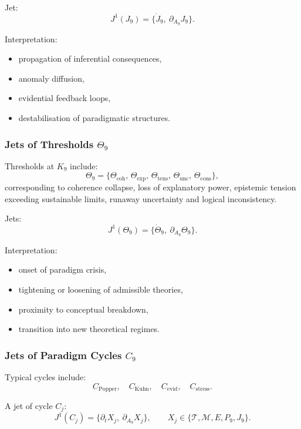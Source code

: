 Jet:
\[
J^1(J_9)=\{\dot{J}_9,\ \partial_{A_9}J_9\}.
\]

Interpretation:
\begin{itemize}
    \item propagation of inferential consequences,
    \item anomaly diffusion,
    \item evidential feedback loops,
    \item destabilisation of paradigmatic structures.
\end{itemize}


\subsubsection{Jets of Thresholds \texorpdfstring{$\Theta_9$}{\Theta_9}}

Thresholds at $K_9$ include:
\[
\Theta_9 =
\{
\Theta_{\mathrm{coh}},\,
\Theta_{\mathrm{exp}},\,
\Theta_{\mathrm{tens}},\,
\Theta_{\mathrm{unc}},\,
\Theta_{\mathrm{cons}}
\},
\]
corresponding to coherence collapse, loss of explanatory power,
epistemic tension exceeding sustainable limits, runaway uncertainty and
logical inconsistency.

Jets:
\[
J^1(\Theta_9)=\{\dot{\Theta}_9,\ \partial_{A_9}\Theta_9\}.
\]

Interpretation:
\begin{itemize}
    \item onset of paradigm crisis,
    \item tightening or loosening of admissible theories,
    \item proximity to conceptual breakdown,
    \item transition into new theoretical regimes.
\end{itemize}


\subsubsection{Jets of Paradigm Cycles \texorpdfstring{$C_9$}{C_9}}

Typical cycles include:
\[
C_{\mathrm{Popper}},\quad
C_{\mathrm{Kuhn}},\quad
C_{\mathrm{evid}},\quad
C_{\mathrm{stress}}.
\]

A jet of cycle $C_j$:
\[
J^1(C_j)
=
\{\partial_t X_j,\ \partial_{A_9}X_j\},
\qquad 
X_j\in
\{\mathcal{T},\mathcal{M},E,P_9,J_9\}.
\]

